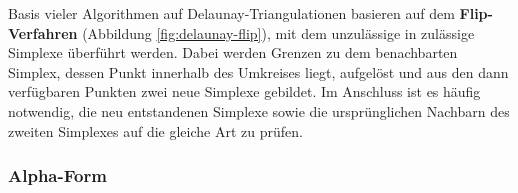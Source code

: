 Basis vieler Algorithmen auf Delaunay-Triangulationen basieren auf dem \textbf{Flip-Verfahren} (Abbildung \ref{fig:delaunay-flip}), mit dem unzulässige in zulässige Simplexe überführt werden.
Dabei werden Grenzen zu dem benachbarten Simplex, dessen Punkt innerhalb des Umkreises liegt, aufgelöst und aus den dann verfügbaren Punkten zwei neue Simplexe gebildet.
Im Anschluss ist es häufig notwendig, die neu entstandenen Simplexe sowie die ursprünglichen Nachbarn des zweiten Simplexes auf die gleiche Art zu prüfen.




\subsubsection{Alpha-Form}
\label{dataalphaform}

